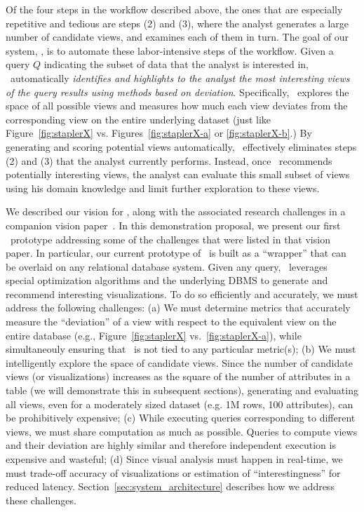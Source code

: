 Of the four steps in the workflow described above, the 
ones that are especially repetitive and tedious are steps (2) and (3),
where the analyst generates a large number of candidate views, and examines each
of them in turn. The goal of our system, \SeeDB, is to automate these
labor-intensive steps of the workflow. Given a query $Q$ indicating the subset
of data that the analyst is interested in, \SeeDB\ automatically {\em identifies and highlights to the analyst the most
interesting views of the query results using methods based on
deviation}. Specifically, \SeeDB\ explores the space of all possible views and
measures how much each view deviates from the corresponding view on the
entire underlying dataset (just like Figure~\ref{fig:staplerX} vs.
Figures~\ref{fig:staplerX-a} or \ref{fig:staplerX-b}.) By generating and
scoring potential views automatically, \SeeDB\ effectively eliminates
steps (2) and (3) that the analyst currently performs. Instead, once \SeeDB\
recommends potentially interesting views, the analyst can evaluate this small
subset of views using his domain knowledge and limit further
exploration to these views. 

We described our vision for \SeeDB, along with the associated research
challenges in a companion vision paper~\cite{DBLP:conf/vldb/Parameswaran2013}.
In this demonstration proposal, we present our first \SeeDB\ prototype
addressing some of the challenges that were listed in that vision paper.
In particular, our current prototype of \SeeDB\ is built as a ``wrapper'' that
can be overlaid on any relational database system. Given any query, \SeeDB\
leverages special optimization algorithms and the underlying DBMS to generate
and recommend interesting visualizations. To do so efficiently and accurately,
we must address the following challenges:
(a) We must determine metrics that accurately measure the ``deviation'' of a
view with respect to the equivalent view on the entire database (e.g.,
Figure~\ref{fig:staplerX} vs.~\ref{fig:staplerX-a}), while simultaneouly
ensuring that \SeeDB\ is not tied to any particular metric(s); (b) We must
intelligently explore the space of candidate views. Since the number of
candidate views (or visualizations) increases as the square of the number of
attributes in a table (we will demonstrate this in subsequent sections),
generating and evaluating all views, even for a moderately sized dataset (e.g.
1M rows, 100 attributes), can be prohibitively expensive;
(c) While executing queries corresponding to different views, we must share
computation as much as possible. Queries to compute views and their
deviation are highly similar and therefore
independent execution is expensive and wasteful; (d) Since
visual analysis must happen in real-time, we must trade-off accuracy
of visualizations or estimation of ``interestingness'' for reduced latency.
Section~\ref{sec:system_architecture} describes how we address these challenges.



